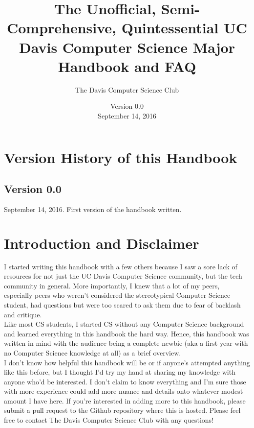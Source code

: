 \documentclass{article}
\title{The Unofficial, Semi-Comprehensive, Quintessential UC Davis Computer Science Major Handbook and FAQ}
\author{The Davis Computer Science Club}
\date{Version 0.0\\September 14, 2016}
\begin{document}
\begin{titlepage}
	\maketitle
\end{titlepage}

\newpage

\tableofcontents

\pagebreak

\singlespacing
\sectionfont{\Large}
\subsectionfont{\large}

\section {Version History of this Handbook}
\subsection*{Version 0.0}
September 14, 2016. First version of the handbook written.
\newpage
\section{Introduction and Disclaimer}
\hspace{0.5cm}I started writing this handbook with a few others because I saw a sore lack of resources for not just the UC Davis Computer Science community, but the tech community in general. More importantly, I knew that a lot of my peers, especially peers who weren't considered the stereotypical Computer Science student, had questions but were too scared to ask them due to fear of backlash and critique. \\

Like most CS students, I started CS without any Computer Science background and learned everything in this handbook the hard way. Hence, this handbook was written in mind with the audience being a complete newbie (aka a first year with no Computer Science knowledge at all) as a brief overview. \\

I don't know how helpful this handbook will be or if anyone's attempted anything like this before, but I thought I'd try my hand at sharing my knowledge with anyone who'd be interested. I don't claim to know everything and I'm sure those with more experience could add more nuance and details onto whatever modest amount I have here. If you're interested in adding more to this handbook, please submit a pull request to the Github repository where this is hosted. Please feel free to contact The Davis Computer Science Club with any questions! 
\end{document}
